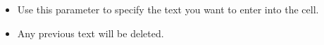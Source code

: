 \begin{itemize}
\item Use this parameter to specify the text you want to enter into the cell.
\item Any previous text will be deleted.
\end{itemize}

